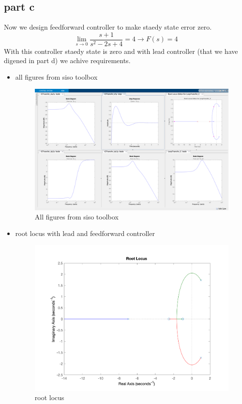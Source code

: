 \subsection{part c}
Now we design feedforward controller to make staedy state error zero.
$$
\lim_{s\to0} \dfrac{s+1}{s^2-2s+4} = 4 \to F(s) = 4
$$
With this controller staedy state is zero and with lead controller (that we have digened in part d) we achive requirements.
\newpage
\begin{itemize}
	\item all figures from siso toolbox
	\begin{figure}[H]
		\caption{All figures from siso toolbox}
		\centering
		\includegraphics[width=16cm]{../Figure/Q1/Q1_c/siso_all.png}
	\end{figure}
	\newpage
	\item root locus with lead and feedforward controller
	\begin{figure}[H]
		\caption{root locus}
		\centering
		\includegraphics[width=12cm]{../Figure/Q1/Q1_c/rlocus.png}

\end{figure}
\end{itemize}
